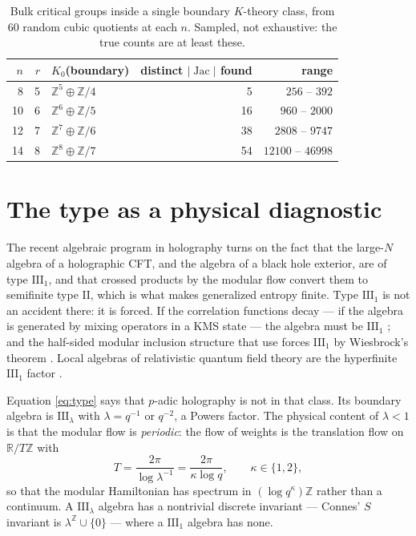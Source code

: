 \documentclass[11pt]{article}
\theoremstyle{plain}
\theoremstyle{remark}
\newcommand{\Z}{\mathbb{Z}}
\newcommand{\Jac}{\operatorname{Jac}}
\newcommand{\III}{\mathrm{III}}
\begin{document}
\begin{table}[ht]
\centering\small
\begin{tabular}{rrlrr}
\toprule
$n$ & $r$ & $K_0$(boundary) & distinct $|\Jac|$ found & range\\
\midrule
 8 & 5 & $\Z^{5}\oplus\Z/4$ &  5 & $256$ -- $392$\\
10 & 6 & $\Z^{6}\oplus\Z/5$ & 16 & $960$ -- $2000$\\
12 & 7 & $\Z^{7}\oplus\Z/6$ & 38 & $2808$ -- $9747$\\
14 & 8 & $\Z^{8}\oplus\Z/7$ & 54 & $12100$ -- $46998$\\
\bottomrule
\end{tabular}
\caption{Bulk critical groups inside a single boundary $K$-theory class, from $60$ random
cubic quotients at each $n$. Sampled, not exhaustive: the true counts are at least these.}
\label{tab:spread}
\end{table}

\section{The type as a physical diagnostic}\label{sec:type}

The recent algebraic program in holography \cite{LL1,LL2,Witten22,CPW23,CLPW23} turns on
the fact that the large-$N$ algebra of a holographic CFT, and the algebra of a black hole
exterior, are of type $\III_1$, and that crossed products by the modular flow convert them
to semifinite type $\mathrm{II}$, which is what makes generalized entropy finite. Type
$\III_1$ is not an accident there: it is forced. If the correlation functions decay --- if
the algebra is generated by mixing operators in a KMS state --- the algebra must be
$\III_1$ \cite{FLMO23}; and the half-sided modular inclusion structure that
\cite{LL1,LL2} use forces $\III_1$ by Wiesbrock's theorem \cite{Wiesbrock93}. Local
algebras of relativistic quantum field theory are the hyperfinite $\III_1$ factor
\cite{BDF87}.

Equation \eqref{eq:type} says that $p$-adic holography is not in that class. Its boundary
algebra is $\III_\lambda$ with $\lambda=q^{-1}$ or $q^{-2}$, a Powers factor. The physical
content of $\lambda<1$ is that the modular flow is \emph{periodic}: the flow of weights is
the translation flow on $\mathbb R/T\mathbb Z$ with
\[
T=\frac{2\pi}{\log\lambda^{-1}}=\frac{2\pi}{\kappa\log q},\qquad\kappa\in\{1,2\},
\]
so that the modular Hamiltonian has spectrum in $(\log q^{\kappa})\Z$ rather than a
continuum. A $\III_\lambda$ algebra has a nontrivial discrete invariant --- Connes' $S$
invariant is $\lambda^{\Z}\cup\{0\}$ --- where a $\III_1$ algebra has none.
\end{document}
